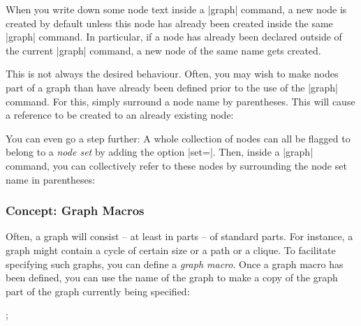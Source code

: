 When you write down some node text inside a |graph| command, a new
node is created by default unless this node has already been created
inside the same |graph| command. In particular, if a node has
already been declared outside of the current |graph| command, a new
node of the same name gets created.

This is not always the desired behaviour. Often, you may wish to make
nodes part of a graph than have already been defined prior to the use
of the |graph| command. For this, simply surround a node name by
parentheses. This will cause a reference to be created to an already
existing node:

\begin{codeexample}[]
\end{codeexample}

You can even go a step further: A whole collection of nodes can all be
flagged to belong to a \emph{node set} by adding the option
|set=|. Then, inside a |graph| command, you can
collectively refer to these nodes by surrounding the node set name in
parentheses: 

\begin{codeexample}[]
\end{codeexample}


\subsubsection{Concept: Graph Macros}

Often, a graph will consist -- at least in parts -- of standard
parts. For instance, a graph might contain a cycle of certain size or
a path or a clique. To facilitate specifying such graphs, you can
define a \emph{graph macro}. Once a graph macro has been defined, you
can use the name of the graph to make a copy of the graph part of the
graph currently being specified:

\begin{codeexample}[]
\tikz {};
\end{codeexample}

